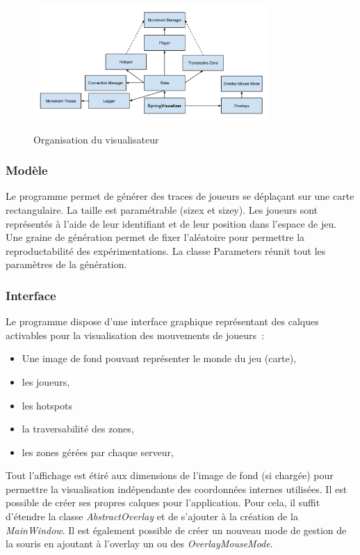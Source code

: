 \begin{figure}[h!]
	\centering
	\includegraphics[width=0.8\textwidth]{SpringVisualizer.png}
	\\[0.2cm]
	\caption{Organisation du visualisateur}
	\label{fig:orga_visu}
\end{figure}

\subsubsection{Modèle}

Le programme permet de générer des traces de joueurs se déplaçant sur une carte rectangulaire.
La taille est paramétrable (sizex et sizey).
Les joueurs sont représentés à l'aide de leur identifiant et de leur position dans l'espace de jeu.
Une graine de génération permet de fixer l'aléatoire pour permettre la reproductabilité des expérimentations.
La classe Parameters réunit tout les paramètres de la génération.

\subsubsection{Interface}

Le programme dispose d'une interface graphique représentant des calques activables pour la visualisation des mouvements de joueurs~:

\begin{itemize}
\item Une image de fond pouvant représenter le monde du jeu (carte),
\item les joueurs,
\item les hotspots
\item la traversabilité des zones,
\item les zones gérées par chaque serveur,
\end{itemize}

Tout l'affichage est étiré aux dimensions de l'image de fond (si chargée) pour permettre la visualisation indépendante des coordonnées internes utilisées.
Il est possible de créer ses propres calques pour l'application.
Pour cela, il suffit d'étendre la classe \textit{AbstractOverlay} et de s'ajouter à la création de la \textit{MainWindow}.
Il est également possible de créer un nouveau mode de gestion de la souris en ajoutant à l'overlay un ou des \textit{OverlayMouseMode}.

